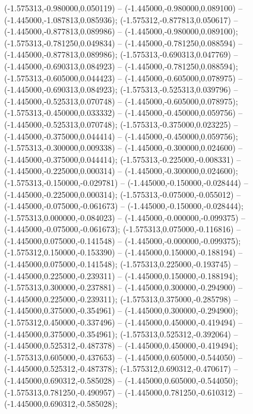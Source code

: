  (-1.575313,-0.980000,0.050119) -- (-1.445000,-0.980000,0.089100) -- (-1.445000,-1.087813,0.085936);
 (-1.575312,-0.877813,0.050617) -- (-1.445000,-0.877813,0.089986) -- (-1.445000,-0.980000,0.089100);
 (-1.575313,-0.781250,0.049834) -- (-1.445000,-0.781250,0.088594) -- (-1.445000,-0.877813,0.089986);
 (-1.575313,-0.690313,0.047769) -- (-1.445000,-0.690313,0.084923) -- (-1.445000,-0.781250,0.088594);
 (-1.575313,-0.605000,0.044423) -- (-1.445000,-0.605000,0.078975) -- (-1.445000,-0.690313,0.084923);
 (-1.575313,-0.525313,0.039796) -- (-1.445000,-0.525313,0.070748) -- (-1.445000,-0.605000,0.078975);
 (-1.575313,-0.450000,0.033332) -- (-1.445000,-0.450000,0.059756) -- (-1.445000,-0.525313,0.070748);
 (-1.575313,-0.375000,0.023225) -- (-1.445000,-0.375000,0.044414) -- (-1.445000,-0.450000,0.059756);
 (-1.575313,-0.300000,0.009338) -- (-1.445000,-0.300000,0.024600) -- (-1.445000,-0.375000,0.044414);
 (-1.575313,-0.225000,-0.008331) -- (-1.445000,-0.225000,0.000314) -- (-1.445000,-0.300000,0.024600);
 (-1.575313,-0.150000,-0.029781) -- (-1.445000,-0.150000,-0.028444) -- (-1.445000,-0.225000,0.000314);
 (-1.575313,-0.075000,-0.055012) -- (-1.445000,-0.075000,-0.061673) -- (-1.445000,-0.150000,-0.028444);
 (-1.575313,0.000000,-0.084023) -- (-1.445000,-0.000000,-0.099375) -- (-1.445000,-0.075000,-0.061673);
 (-1.575313,0.075000,-0.116816) -- (-1.445000,0.075000,-0.141548) -- (-1.445000,-0.000000,-0.099375);
 (-1.575312,0.150000,-0.153390) -- (-1.445000,0.150000,-0.188194) -- (-1.445000,0.075000,-0.141548);
 (-1.575313,0.225000,-0.193745) -- (-1.445000,0.225000,-0.239311) -- (-1.445000,0.150000,-0.188194);
 (-1.575313,0.300000,-0.237881) -- (-1.445000,0.300000,-0.294900) -- (-1.445000,0.225000,-0.239311);
 (-1.575313,0.375000,-0.285798) -- (-1.445000,0.375000,-0.354961) -- (-1.445000,0.300000,-0.294900);
 (-1.575312,0.450000,-0.337496) -- (-1.445000,0.450000,-0.419494) -- (-1.445000,0.375000,-0.354961);
 (-1.575313,0.525312,-0.392064) -- (-1.445000,0.525312,-0.487378) -- (-1.445000,0.450000,-0.419494);
 (-1.575313,0.605000,-0.437653) -- (-1.445000,0.605000,-0.544050) -- (-1.445000,0.525312,-0.487378);
 (-1.575312,0.690312,-0.470617) -- (-1.445000,0.690312,-0.585028) -- (-1.445000,0.605000,-0.544050);
 (-1.575313,0.781250,-0.490957) -- (-1.445000,0.781250,-0.610312) -- (-1.445000,0.690312,-0.585028);

